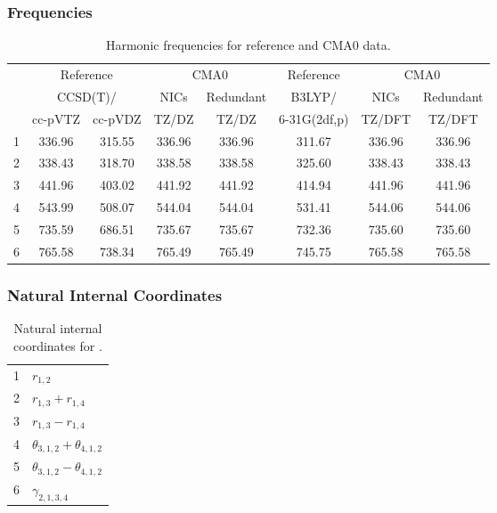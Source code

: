 \documentclass[10pt,oneside]{article}
\begin{document}
\begin{table}[h!]
\subsubsection*{Frequencies}
\centering
\caption{Harmonic frequencies for reference and CMA0 data.}
\begin{tabular}{cccccccc}
\toprule
{} & \multicolumn{2}{c}{Reference} & \multicolumn{2}{c}{CMA0} &    Reference & \multicolumn{2}{c}{CMA0} \\
{} & \multicolumn{2}{c}{CCSD(T)/} &   NICs &  Redundant &       B3LYP/ &   NICs & Redundant \\
{} &   cc-pVTZ & cc-pVDZ &  TZ/DZ &      TZ/DZ & 6-31G(2df,p) & TZ/DFT &    TZ/DFT \\
\midrule
1 &    336.96 &  315.55 & 336.96 &     336.96 &       311.67 & 336.96 &    336.96 \\
2 &    338.43 &  318.70 & 338.58 &     338.58 &       325.60 & 338.43 &    338.43 \\
3 &    441.96 &  403.02 & 441.92 &     441.92 &       414.94 & 441.96 &    441.96 \\
4 &    543.99 &  508.07 & 544.04 &     544.04 &       531.41 & 544.06 &    544.06 \\
5 &    735.59 &  686.51 & 735.67 &     735.67 &       732.36 & 735.60 &    735.60 \\
6 &    765.58 &  738.34 & 765.49 &     765.49 &       745.75 & 765.58 &    765.58 \\
\bottomrule
\end{tabular}
\end{table}

\begin{table}[h!]
\subsubsection*{Natural Internal Coordinates}
\centering
\caption{Natural internal coordinates for .}
\small
\begin{tabular}{ll}
\toprule
  1   & $r_{1,2}$ \\
  2   & $r_{1,3} + r_{1,4}$ \\
  3   & $r_{1,3} - r_{1,4}$ \\
  4   & $\theta_{3,1,2} + \theta_{4,1,2}$ \\
  5   & $\theta_{3,1,2} - \theta_{4,1,2}$ \\
  6   & $\gamma_{2,1,3,4}$ \\
\bottomrule
\end{tabular}
\end{table}
\end{document}
